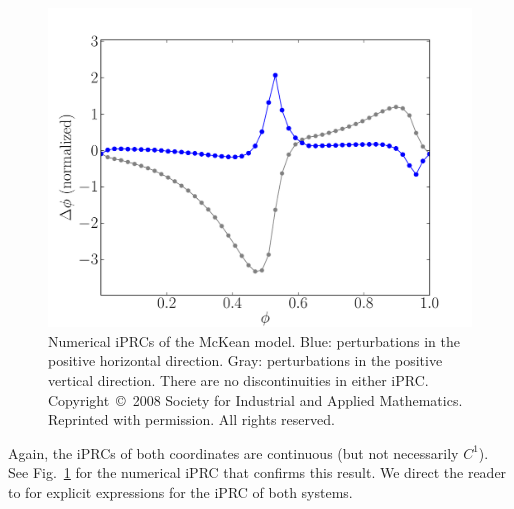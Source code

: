 \documentclass[a4paper,12pt]{article}
\begin{document}
\begin{figure}[h!]
\begin{center} \includegraphics[width=1\textwidth]{pmk_prc_fig.pdf}\end{center}
\caption[Numerical iPRCs of the McKean model]{Numerical iPRCs of the McKean model. Blue: perturbations in the positive horizontal direction. Gray: perturbations in the positive vertical direction.  There are no discontinuities in either iPRC. Copyright~\copyright ~2008 Society for Industrial and Applied Mathematics.  Reprinted with permission.  All rights reserved.}
\label{fig:pmk_iprc}\end{figure}

Again, the iPRCs of both coordinates are continuous (but not necessarily $C^1$).  See Fig.~\ref{fig:pmk_iprc} for the numerical iPRC that confirms this result.  We direct the reader to \cite{Coombes:2008:SIADS} for explicit expressions for the iPRC of both systems.
\end{document}
